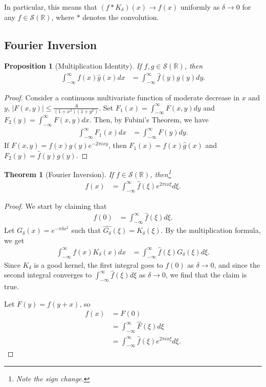 \documentclass[12pt]{extarticle}
\newcommand{\R}{\mathbb{R}}
\theoremstyle{plain}
\newtheorem*{theorem}{Theorem}%
\newtheorem*{proposition}{Proposition}%
\theoremstyle{definition}
\theoremstyle{remark}
\renewcommand{\newline}{\hfill\break}
\begin{document}
  In particular, this means that $(f\ast K_{\delta})(x) \rightarrow f(x)$ uniformly as $\delta \rightarrow 0$ for any $f\in \mathcal{S}(\R)$, where $\ast$ denotes the convolution.
  \subsection{Fourier Inversion}%
  \begin{proposition}[Multiplication Identity]
    If $f,g\in \mathcal{S}(\R)$, then
    \begin{align*}
      \int_{-\infty}^{\infty}f(x)\hat{g}(x)dx &= \int_{-\infty}^{\infty}\hat{f}(y)g(y)dy.
    \end{align*}
  \end{proposition}
  \begin{proof}
    Consider a continuous multivariate function of moderate decrease in $x$ and $y$, $|F(x,y)| \leq \frac{A}{(1+x^2)(1+y^2)}$. Set $F_1(x) = \int_{-\infty}^{\infty}F(x,y)dy$ and $F_2(y) = \int_{-\infty}^{\infty}F(x,y)dx$. Then, by Fubini's Theorem, we have
    \begin{align*}
      \int_{-\infty}^{\infty}F_1(x)dx &= \int_{-\infty}^{\infty}F(y)dy.
    \end{align*}
    If $F(x,y) = f(x)g(y)e^{-2\pi i x y}$, then $F_1(x) = f(x)\hat{g}(x)$ and $F_2(y) = \hat{f}(y)g(y)$.
  \end{proof}
  \begin{theorem}[Fourier Inversion]
    If $f\in \mathcal{S}(\R)$, then\footnote{Note the sign change.}
    \begin{align*}
      f(x) &= \int_{-\infty}^{\infty}\hat{f}(\xi)e^{2\pi i x \xi}d\xi.
    \end{align*}
  \end{theorem}
  \begin{proof}
    We start by claiming that
    \begin{align*}
      f(0) &= \int_{-\infty}^{\infty}\hat{f}(\xi)d\xi.
    \end{align*}
    Let $G_{\delta}(x) = e^{-\pi \delta x^2}$ such that $\widehat{G_{\delta}}(\xi) = K_{\delta}(\xi)$. By the multiplication formula, we get
    \begin{align*}
      \int_{-\infty}^{\infty}f(x)K_{\delta}(x) dx &= \int_{-\infty}^{\infty}\hat{f}(\xi)G_{\delta}(\xi)d\xi.
    \end{align*}
    Since $K_{\delta}$ is a good kernel, the first integral goes to $f(0)$ as $\delta \rightarrow 0$, and since the second integral converges to $\int_{-\infty}^{\infty}\hat{f}(\xi)d\xi$ as $\delta \rightarrow 0$, we find that the claim is true.\newline

    Let $F(y) = f(y+x)$, so
    \begin{align*}
      f(x) &= F(0)\\
           &= \int_{-\infty}^{\infty}\hat{F}(\xi)d\xi\\
           &= \int_{-\infty}^{\infty}\hat{f}(\xi)e^{2\pi i x \xi}d\xi.
    \end{align*}
  \end{proof}
\end{document}
